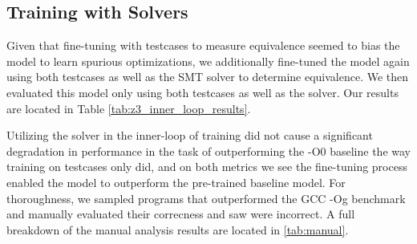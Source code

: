 \documentclass{article}
\begin{document}
\subsection{Training with Solvers}

Given that fine-tuning with testcases to measure equivalence seemed to bias the model to learn spurious optimizations, we additionally fine-tuned the model again using both testcases as well as the SMT solver to determine equivalence. We then evaluated this model only using both testcases as well as the solver. Our results are located in Table \ref{tab:z3_inner_loop_results}. 

Utilizing the solver in the inner-loop of training did not cause a significant degradation in performance in the task of outperforming the -O0 baseline the way training on testcases only did, and on both metrics we see the fine-tuning process enabled the model to outperform the pre-trained baseline model. For thoroughness, we sampled  programs that outperformed the GCC -Og benchmark and manually evaluated their correcness and saw  were incorrect. A full breakdown of the manual analysis results are located in \ref{tab:manual}.


\end{document}
